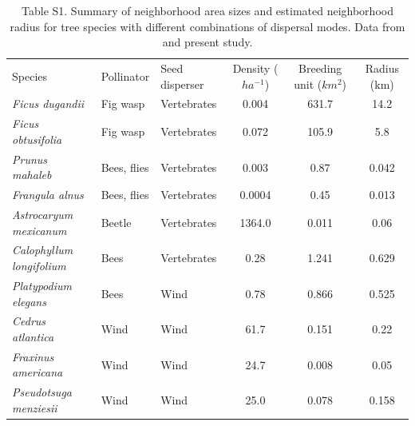 \documentclass[a4paper, 12pt]{article}
\begin{document}
\begin{landscape}
\begin{table}
  \caption*{Table S1. Summary of neighborhood area sizes and estimated neighborhood radius for tree species with different combinations of dispersal modes. Data from \citet{Nason:1998aa,Garcia:2005fu,Garcia:2007he} and present study.}
    \begin{tabular}{lllccc}
     Species                & Pollinator  & Seed disperser & Density ($ha^{-1}$) & Breeding unit ($km^2$) & Radius (km) \\
    \textit{Ficus dugandii}          & Fig wasp    & Vertebrates    & 0.004          & 631.7               & 14.2        \\
    \textit{Ficus obtusifolia}       & Fig wasp    & Vertebrates    & 0.072          & 105.9               & 5.8         \\
    \textit{Prunus mahaleb}          & Bees, flies & Vertebrates    & 0.003          & 0.87                & 0.042       \\
    \textit{Frangula alnus}          & Bees, flies & Vertebrates    & 0.0004         & 0.45                & 0.013       \\
    \textit{Astrocaryum mexicanum}   & Beetle      & Vertebrates    & 1364.0         & 0.011               & 0.06        \\
    \textit{Calophyllum longifolium} & Bees        & Vertebrates    & 0.28           & 1.241               & 0.629       \\
    \textit{Platypodium elegans}     & Bees        & Wind           & 0.78           & 0.866               & 0.525       \\
    \textit{Cedrus atlantica}        & Wind        & Wind           & 61.7           & 0.151               & 0.22        \\
   \textit{Fraxinus americana}      & Wind        & Wind           & 24.7           & 0.008               & 0.05        \\
    \textit{Pseudotsuga menziesii}   & Wind        & Wind           & 25.0           & 0.078               & 0.158       \\
    \end{tabular}
\end{table}
\end{landscape}
\newpage 
\end{document}
